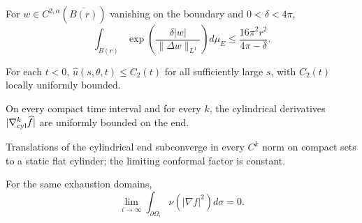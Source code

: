 \begin{lemma}
\label{lem:chow-iv-brezis-merle}

For \(w\in C^{2,\alpha}(\overline{B(r)})\) vanishing on the boundary and
\(0<\delta<4\pi\),
\[
\int_{B(r)}\exp\!\left(\frac{\delta|w|}{\|\Delta w\|_{L^1}}\right)d\mu_E
\le\frac{16\pi^2r^2}{4\pi-\delta}.
\]
\end{lemma}

\begin{lemma}
\label{lem:chow-iv-conformal-factor-upper}


For each \(t<0\), \(\widehat u(s,\theta,t)\le C_2(t)\) for all sufficiently
large \(s\), with \(C_2(t)\) locally uniformly bounded.
\end{lemma}

\begin{lemma}[Higher derivative bounds for \(\widehat f=-\log\widehat u\)]
\label{lem:chow-iv-conformal-factor-derivatives}


On every compact time interval and for every \(k\), the cylindrical derivatives
\(|\nabla^k_{\rm cyl}\widehat f|\) are uniformly bounded on the end.
\end{lemma}

\begin{lemma}
\label{lem:chow-iv-pointwise-flat-cylinder}


Translations of the cylindrical end subconverge in every \(C^k\) norm on
compact sets to a static flat cylinder; the limiting conformal factor is constant.
\end{lemma}

\begin{lemma}
\label{lem:chow-iv-second-boundary-term}


For the same exhaustion domains,
\[
\lim_{i\to\infty}\int_{\partial\Omega_i}\nu(|\nabla f|^2)d\sigma=0.
\]
\end{lemma}

